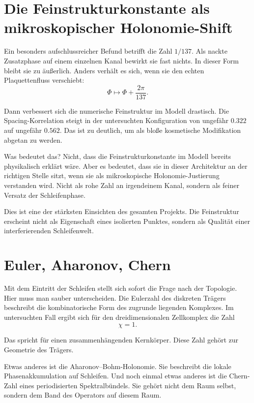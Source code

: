 \documentclass[11pt,a4paper]{article}
\theoremstyle{remark}
\begin{document}
	\section{Die Feinstrukturkonstante als mikroskopischer Holonomie-Shift}
	
	Ein besonders aufschlussreicher Befund betrifft die Zahl $1/137$. Als nackte Zusatzphase auf einem einzelnen Kanal bewirkt sie fast nichts. In dieser Form bleibt sie zu äußerlich. Anders verhält es sich, wenn sie den echten Plaquettenfluss verschiebt:
	\begin{equation}
		\Phi \mapsto \Phi + \frac{2\pi}{137}.
	\end{equation}
	
	Dann verbessert sich die numerische Feinstruktur im Modell drastisch. Die Spacing-Korrelation steigt in der untersuchten Konfiguration von ungefähr $0.322$ auf ungefähr $0.562$. Das ist zu deutlich, um als bloße kosmetische Modifikation abgetan zu werden.
	
	Was bedeutet das? Nicht, dass die Feinstrukturkonstante im Modell bereits physikalisch erklärt wäre. Aber es bedeutet, dass sie in dieser Architektur an der richtigen Stelle sitzt, wenn sie als mikroskopische Holonomie-Justierung verstanden wird. Nicht als rohe Zahl an irgendeinem Kanal, sondern als feiner Versatz der Schleifenphase.
	
	Dies ist eine der stärksten Einsichten des gesamten Projekts. Die Feinstruktur erscheint nicht als Eigenschaft eines isolierten Punktes, sondern als Qualität einer interferierenden Schleifenwelt.
	
	\section{Euler, Aharonov, Chern}
	
	Mit dem Eintritt der Schleifen stellt sich sofort die Frage nach der Topologie. Hier muss man sauber unterscheiden. Die Eulerzahl des diskreten Trägers beschreibt die kombinatorische Form des zugrunde liegenden Komplexes. Im untersuchten Fall ergibt sich für den dreidimensionalen Zellkomplex die Zahl
	\begin{equation}
		\chi=1.
	\end{equation}
	
	Das spricht für einen zusammenhängenden Kernkörper. Diese Zahl gehört zur Geometrie des Trägers.
	
	Etwas anderes ist die Aharonov--Bohm-Holonomie. Sie beschreibt die lokale Phasenakkumulation auf Schleifen. Und noch einmal etwas anderes ist die Chern-Zahl eines periodisierten Spektralbündels. Sie gehört nicht dem Raum selbst, sondern dem Band des Operators auf diesem Raum.
	
\end{document}
